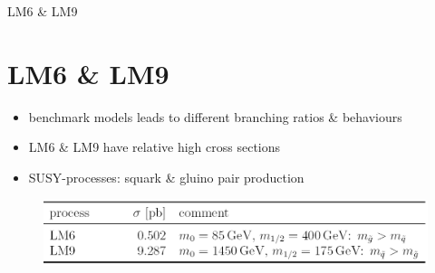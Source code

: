 \begin{frame}{LM6 \& LM9}
\section{LM6 \& LM9}
\begin{itemize}
\item benchmark models leads to different branching ratios \& behaviours\\
\item LM6 \& LM9 have relative high cross sections\\ 
\item SUSY-processes: squark \& gluino pair production
\end{itemize}

\begin{figure}[H]
	\centering
	 \includegraphics[width=\textwidth,]{figures/properties.png}
\end{figure}

\end{frame}

